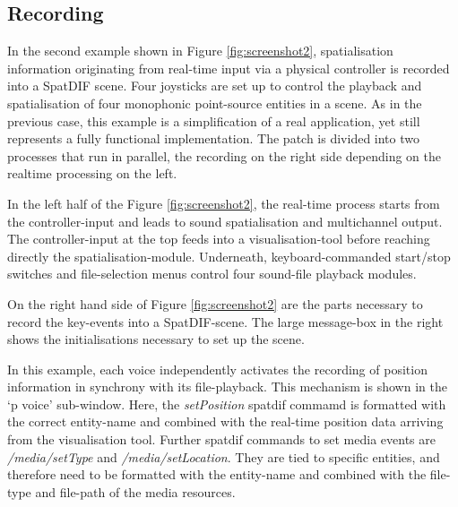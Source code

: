 \documentclass{article}
\begin{document}
\subsection{Recording}\label{subsec:recording}

In the second example shown in Figure \ref{fig:screenshot2}, spatialisation information originating from real-time input via a physical controller is recorded into a SpatDIF scene.
Four joysticks are set up to control the playback and spatialisation of four monophonic point-source entities in a scene.
As in the previous case, this example is a simplification of a real application, yet still represents a fully functional implementation.
The patch is divided into two processes that run in parallel, the recording on the right side depending on the
realtime processing on the left.
 
In the left half of the Figure \ref{fig:screenshot2}, the real-time process starts from the controller-input and leads to sound spatialisation and multichannel output.
The controller-input at the top feeds into a visualisation-tool before reaching directly the spatialisation-module.
Underneath, keyboard-commanded start/stop switches and file-selection menus control four sound-file playback modules.

On the right hand side of Figure \ref{fig:screenshot2} are the parts necessary to record the key-events into a SpatDIF-scene.
The large message-box in the right shows the initialisations necessary to set up the scene.

In this example, each voice independently activates the recording of position information in synchrony with its file-playback.
This mechanism is shown in the `p voice' sub-window. 
Here, the \emph{setPosition} spatdif commamd is formatted with the correct entity-name and combined with the real-time position data arriving from the visualisation tool.
Further spatdif commands to set media events are \emph{/media/setType} and \emph{/media/setLocation}.
They are tied to specific entities, and therefore need to be formatted with the entity-name and combined with the file-type and file-path of the media resources.
\end{document}
